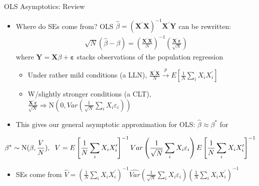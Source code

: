 \documentclass[11pt,english]{beamer}
\begin{document}
\begin{frame}{OLS Asymptotics: Review}

\begin{itemize}
\item Where do SEs come from? OLS $\hat\beta=(\mathbf{X}^\prime\mathbf{X})^{-1}\mathbf{X}^\prime\mathbf{Y}$ can be rewritten:
\begin{align*}
\sqrt{N}(\hat\beta - \beta) = \left(\frac{\mathbf{X}^\prime\mathbf{X}}{N}\right)^{-1} \left(\frac{\mathbf{X}^\prime\boldsymbol\varepsilon}{\sqrt{N}}\right)
\end{align*}
where $\mathbf{Y}=\mathbf{X}\beta + \boldsymbol{\varepsilon}$ stacks observations of the population regression \smallskip\pause{}
\begin{itemize}
\item Under rather mild conditions (a LLN), $\frac{\mathbf{X}^\prime\mathbf{X}}{N}\xrightarrow{p}E\left[\frac{1}{N}\sum_i X_iX_i^\prime\right]$\smallskip\pause{}
\item W/slightly stronger conditions (a CLT), $\frac{\mathbf{X}^\prime\boldsymbol\varepsilon}{\sqrt{N}}\Rightarrow \mathrm{N}(0,Var(\frac{1}{\sqrt{N}}\sum_i X_i\varepsilon_i))$
\end{itemize}\medskip\pause{}
\item This gives our general asymptotic approximation for OLS: $\hat\beta\approx\beta^*$ for
\end{itemize}
\begin{align*}
\beta^* \sim \mathrm{N}(\beta,\frac{V}{N}),\hspace{0.2cm} V=E\left[\frac{1}{N}\sum_i X_iX_i^\prime\right]^{-1} Var\left(\frac{1}{\sqrt{N}}\sum_i X_i\varepsilon_i\right) E\left[\frac{1}{N}\sum_i X_iX_i^\prime\right]^{-1}
\end{align*}\pause{}
\begin{itemize}
\item SEs come from $\hat{V}=\left(\frac{1}{N}\sum_i X_iX_i^\prime\right)^{-1} \widehat{Var}\left(\frac{1}{\sqrt{N}}\sum_i X_i\varepsilon_i\right) \left(\frac{1}{N}\sum_i X_iX_i^\prime\right)^{-1}$
\end{itemize}
\end{frame}
\end{document}
